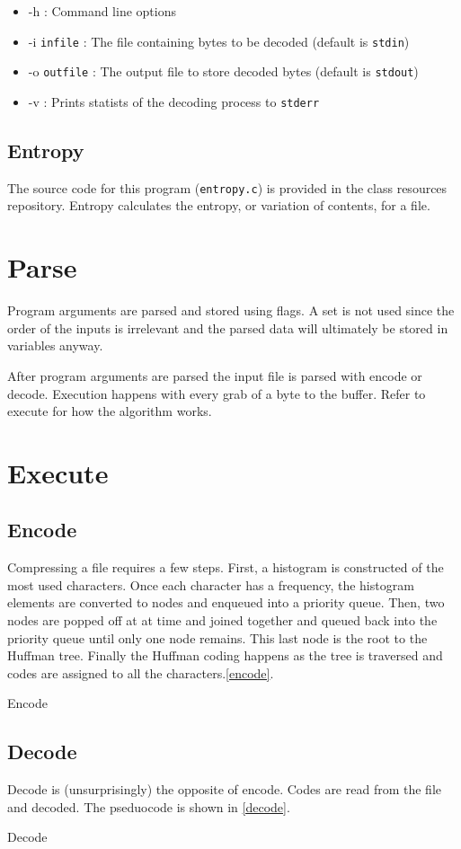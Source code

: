 \documentclass[12pt]{article}
\def\code#1{\texttt{#1}} %
\begin{document}
\begin{itemize}
	\item{-h : Command line options }
	\item{-i \code{infile} : The file containing bytes to be decoded (default is \code{stdin})}
	\item{-o \code{outfile} : The output file to store decoded bytes (default is \code{stdout})}
	\item{-v : Prints statists of the decoding process to \code{stderr}}
\end{itemize}

\subsection{Entropy}

The source code for this program (\code{entropy.c}) is provided in the class resources repository.
Entropy calculates the entropy, or variation of contents, for a file.

\section{Parse}

Program arguments are parsed and stored using flags.
A set is not used since the order of the inputs is irrelevant and the parsed data
will ultimately be stored in variables anyway.

After program arguments are parsed the input file is parsed with encode or decode.
Execution happens with every grab of a byte to the buffer.
Refer to execute for how the algorithm works.

\section{Execute}

\subsection{Encode}

Compressing a file requires a few steps. First, a histogram is constructed of the
most used characters. Once each character has a frequency, the histogram elements
are converted to nodes and enqueued into a priority queue. Then, two nodes are 
popped off at at time and joined together and queued back into the priority
queue until only one node remains. This last node is the root to the Huffman
tree. Finally the Huffman coding happens as the tree is traversed and codes
are assigned to all the characters.\vref{encode}.

\begin{algorithm}
	\caption{Encode}\label{encode}
\end{algorithm}

\subsection{Decode}

Decode is (unsurprisingly) the opposite of encode. Codes are read from the file
and decoded.
The pseduocode is shown in \vref{decode}.

\begin{algorithm}
	\caption{Decode}\label{decode}
\end{algorithm}
\end{document}
